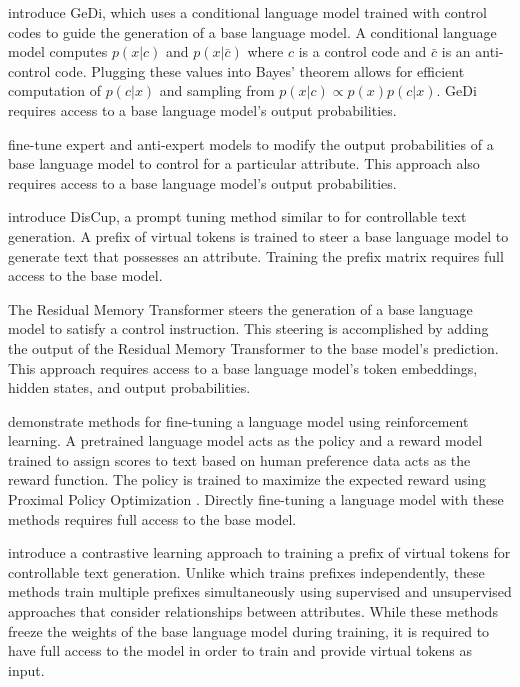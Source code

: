 \documentclass[phd,electronic,oneside,twosidetoc,letterpaper,chaptercenter,parttop,lof]{byumsphd}
\begin{document}
\cite{krause2021gedi} introduce GeDi, which uses a conditional language model trained with control codes to guide the generation of a base language model. 
A conditional language model computes \(p(x | c)\) and \(p(x | \bar{c})\) where \(c\) is a control code and \(\bar{c}\) is an anti-control code.
Plugging these values into Bayes' theorem allows for efficient computation of \(p(c | x)\) and sampling from \(p(x | c) \propto p(x) p(c | x)\).
GeDi requires access to a base language model's output probabilities.

\cite{liu2021dexpert} fine-tune expert and anti-expert models to modify the output probabilities of a base language model to control for a particular attribute.
This approach also requires access to a base language model's output probabilities.

\cite{zhang2022discup} introduce DisCup, a prompt tuning method similar to \cite{li2021prefix} for controllable text generation. 
A prefix of virtual tokens is trained to steer a base language model to generate text that possesses an attribute. 
Training the prefix matrix requires full access to the base model.

The Residual Memory Transformer \citep{zhang2023rmt} steers the generation of a base language model to satisfy a control instruction.
This steering is accomplished by adding the output of the Residual Memory Transformer to the base model's prediction.
This approach requires access to a base language model's token embeddings, hidden states, and output probabilities. 

\citet{ziegler2019preferences} demonstrate methods for fine-tuning a language model using reinforcement learning.
A pretrained language model acts as the policy and a reward model trained to assign scores to text based on human preference data acts as the reward function.
The policy is trained to maximize the expected reward using Proximal Policy Optimization \citep{schulman2017ppo}.
Directly fine-tuning a language model with these methods requires full access to the base model.

\citet{qian-etal-2022-controllable} introduce a contrastive learning approach to training a prefix of virtual tokens for controllable text generation.
Unlike \cite{li2021prefix} which trains prefixes independently, these methods train multiple prefixes simultaneously using supervised and unsupervised approaches that consider relationships between attributes. 
While these methods freeze the weights of the base language model during training, it is required to have full access to the model in order to train and provide virtual tokens as input.
\end{document}
